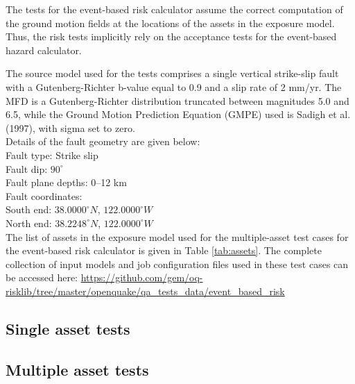The tests for the event-based risk calculator assume the correct computation of the ground motion fields at the locations of the assets in the exposure model. Thus, the risk tests implicitly rely on the acceptance tests for the event-based hazard calculator.

The source model used for the tests comprises a single vertical strike-slip fault with a Gutenberg-Richter b-value equal to 0.9 and a slip rate of 2 mm/yr. The MFD is a Gutenberg-Richter distribution truncated between magnitudes 5.0 and 6.5, while the Ground Motion Prediction Equation (GMPE) used is Sadigh et al. (1997), with sigma set to zero.\\

\noindent Details of the fault geometry are given below:\\

\noindent
Fault type: Strike slip\\
Fault dip: $90^{\circ}$\\
Fault plane depths: 0--12 km\\
Fault coordinates:\\
South end: $38.0000^{\circ} N$, $122.0000^{\circ} W$\\
North end: $38.2248^{\circ} N$, $122.0000^{\circ} W$\\



The list of assets in the exposure model used for the multiple-asset test cases for the event-based risk calculator is given in Table \ref{tab:assets}. The complete collection of input models and job configuration files used in these test cases can be accessed here:
\href{https://github.com/gem/oq-risklib/tree/master/openquake/qa_tests_data/event_based_risk}
{https://github.com/gem/oq-risklib/tree/master/openquake/qa\_tests\_data/event\_based\_risk}

\subsection{Single asset tests}
\label{subsec:acc-ebr-single}


\subsection{Multiple asset tests}
\label{subsec:acc-ebr-multiple}


